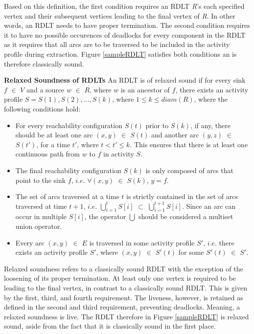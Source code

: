 Based on this definition, the first condition requires an RDLT \emph{R}'s each specified vertex and their subsequent vertices leading to the final vertex of \emph{R}. In other words, an RDLT needs to have proper termination. 
The second condition requires it to have no possible occurences of deadlocks for every component in the RDLT as it requires that all arcs are to be traversed to be included in the activity profile during extraction. Figure \ref{sampleRDLT} satisfies both conditions an is therefore classically sound.

\begin{defn}\textbf{Relaxed Soundness of RDLTs} \cite{Malinao2017, MalinaoPJS2023, Sulla2023}
    \label{RelaxedRDLTDef}
    An RDLT is of relaxed sound if for every sink $ f $ $ \in $ $ V $ and a source $ w $ $ \in $ $ R $, where $ w $ is an ancestor of $ f $, there exists an activity profile $ S = {S(1), S(2), ..., S(k)} $, where $ 1 \leq k \leq diam(R) $, where the following conditions hold:
    \begin{itemize}
        \item For every reachability configuration $ S(t) $ prior to $ S(k) $, if any, there should be at least one arc $ (x,y) $ $ \in $ $ S(t) $ and another arc $ (y,z) $ $ \in $ $ S(t') $, for a time $ t' $, where $ t < t' \leq k $. This ensures that there is at least one continuous path from $ w $ to $ f $ in activity $ S $.
        \item The final reachability configuration $ S(k) $ is only composed of arcs that point to the sink $ f $, $ i.e. $ $ \forall (x,y) $ $ \in $ $ S(k) $, $ y = f $.
        \item The set of arcs traversed at a time $ t $ is strictly contained in the set of arcs traversed at time $ t + 1 $, $ i.e. $ $ \bigcup_{i=1}^{t} S[i] $ $ \subset $ $ \bigcup_{i=1}^{t+1} S[i] $. Since an arc can occur in multiple $ S[i] $, the operator $ \bigcup $ should be considered a multiset union operator.
        \item Every arc $ (x,y) $ $ \in $ $ E $ is traversed in some activity profile $ S' $, $ i.e. $ there exists an activity profile $ S' $, where $ (x,y) $ $ \in $ $ S'(t) $ for some $ S'(t) $ $ \in $ $ S' $.
    \end{itemize}
\end{defn}
Relaxed soundness refers to a classically sound RDLT with the exception of the loosening of its proper termination. At least only one vertex is required to be leading to the final vertex, in contrast to a classically sound RDLT. This is given by the first, third, and fourth requirement. The liveness, however, is retained as defined in the second and third requirement, preventing deadlocks. Meaning, a relaxed soundness is live.  The RDLT therefore in Figure \ref{sampleRDLT} is relaxed sound, aside from the fact that it is classically sound in the first place.

